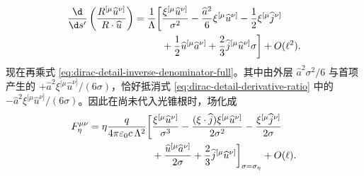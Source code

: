 \begin{align}
 {\d\over\d s'}
 \left({R^{[\mu}\widehat u^{\nu]}\over R\cdot \widehat u}\right)
 ={1\over\Lambda}\bigg[{}
 &{\xi^{[\mu}\widehat u^{\nu]}\over\sigma^2}
 -{\widehat a^2\over6}\xi^{[\mu}\widehat u^{\nu]}
 -{1\over2}\xi^{[\mu}\widehat j^{\nu]}
 \notag\\
 &+{1\over2}\widehat u^{[\mu}\widehat a^{\nu]}
 +{2\over3}\widehat j^{[\mu}\widehat u^{\nu]}\sigma
 \bigg]+O(\ell^2).
 \label{eq:dirac-detail-derivative-ratio}
\end{align}
现在再乘式 \eqref{eq:dirac-detail-inverse-denominator-full}。其中由外层 $\widehat a^2\sigma^2/6$ 与首项产生的 $+\widehat a^2\xi^{[\mu}\widehat u^{\nu]}/(6\sigma)$，恰好抵消式 \eqref{eq:dirac-detail-derivative-ratio} 中的 $-\widehat a^2\xi^{[\mu}\widehat u^{\nu]}/(6\sigma)$。因此在尚未代入光锥根时，场化成
\begin{align}
 F_\eta^{\mu\nu}
 =\eta{q\over4\pi\varepsilon_0c\,\Lambda^2}
 \bigg[{}
 &{\xi^{[\mu}\widehat u^{\nu]}\over\sigma^3}
 -{(\xi\cdot \widehat j)\xi^{[\mu}\widehat u^{\nu]}\over2\sigma^2}
 -{\xi^{[\mu}\widehat j^{\nu]}\over2\sigma}
 \notag\\
 &+{\widehat u^{[\mu}\widehat a^{\nu]}\over2\sigma}
 +{2\over3}\widehat j^{[\mu}\widehat u^{\nu]}
 \bigg]_{\sigma=\sigma_\eta}
 +O(\ell).
 \label{eq:dirac-detail-field-before-roots}
\end{align}

